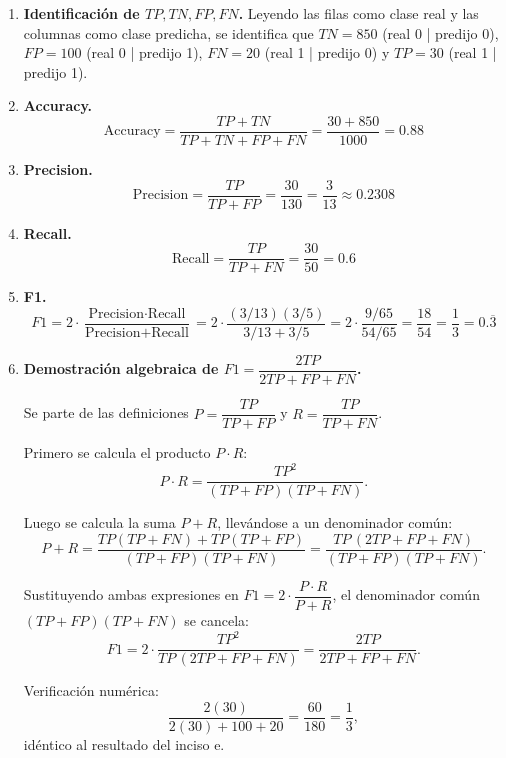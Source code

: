 \begin{enumerate}

\item \textbf{Identificación de $TP,TN,FP,FN$.}
Leyendo las filas como clase real y las columnas como clase predicha,
se identifica que $TN=850$ (real 0 | predijo 0), $FP=100$ (real 0 | predijo 1), $FN=20$ (real 1 | predijo 0) y $TP=30$ (real 1 | predijo 1).

\item \textbf{Accuracy.}
\[
    \text{Accuracy} = \frac{TP+TN}{TP+TN+FP+FN} = \frac{30+850}{1000} = 0.88
\]

\item \textbf{Precision.}
\[
    \text{Precision} = \frac{TP}{TP+FP} = \frac{30}{130} = \frac{3}{13} \approx 0.2308
\]

\item \textbf{Recall.}
\[
    \text{Recall} = \frac{TP}{TP+FN} = \frac{30}{50} = 0.6
\]

\item \textbf{F1.}
\[
    F1 = 2\cdot\frac{\text{Precision}\cdot\text{Recall}}{\text{Precision}+\text{Recall}}
       = 2\cdot\frac{(3/13)(3/5)}{3/13+3/5}
       = 2\cdot\frac{9/65}{54/65}
       = \frac{18}{54} = \frac13 = 0.\overline{3}
\]

\item \textbf{Demostración algebraica de $F1 = \dfrac{2TP}{2TP+FP+FN}$.}

Se parte de las definiciones $P = \dfrac{TP}{TP+FP}$ y $R = \dfrac{TP}{TP+FN}$.

Primero se calcula el producto $P\cdot R$:
\[
    P\cdot R = \frac{TP^2}{(TP+FP)(TP+FN)}.
\]

Luego se calcula la suma $P+R$, llevándose a un denominador común:
\[
    P + R = \frac{TP(TP+FN)+TP(TP+FP)}{(TP+FP)(TP+FN)} = \frac{TP\,(2TP+FP+FN)}{(TP+FP)(TP+FN)}.
\]

Sustituyendo ambas expresiones en $F1 = 2\cdot\dfrac{P\cdot R}{P+R}$,
el denominador común $(TP+FP)(TP+FN)$ se cancela:
\[
    F1 = 2\cdot\frac{TP^2}{TP\,(2TP+FP+FN)} = \frac{2TP}{2TP+FP+FN}.
\]

Verificación numérica:
\[
    \frac{2(30)}{2(30)+100+20} = \frac{60}{180} = \frac13,
\]
idéntico al resultado del inciso e.

\end{enumerate}
